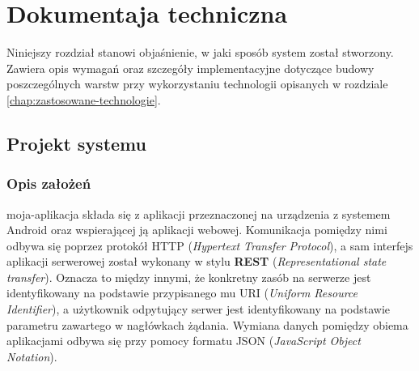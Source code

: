 \chapter{Dokumentaja techniczna}\label{chap:dokumentacja-techniczna}
Niniejszy rozdział stanowi objaśnienie, w jaki sposób system został stworzony. Zawiera opis wymagań oraz szczegóły implementacyjne dotyczące budowy poszczególnych warstw przy wykorzystaniu technologii opisanych w rozdziale \ref{chap:zastosowane-technologie}.
\section{Projekt systemu}
\subsection{Opis założeń}
moja-aplikacja składa się z aplikacji przeznaczonej na urządzenia z systemem Android \cite{android} oraz wspierającej ją aplikacji webowej. Komunikacja pomiędzy nimi odbywa się poprzez protokół HTTP (\textit{Hypertext Transfer Protocol}), a sam interfejs aplikacji serwerowej został wykonany w stylu \textbf{REST} (\textit{Representational state transfer}). Oznacza to między innymi, że konkretny zasób na serwerze jest identyfikowany na podstawie przypisanego mu URI (\textit{Uniform Resource Identifier}), a użytkownik odpytujący serwer jest identyfikowany na podstawie parametru zawartego w nagłówkach żądania. Wymiana danych pomiędzy obiema aplikacjami odbywa się przy pomocy formatu JSON (\textit{JavaScript Object Notation}). \cite{ksiazka-asp-core}

